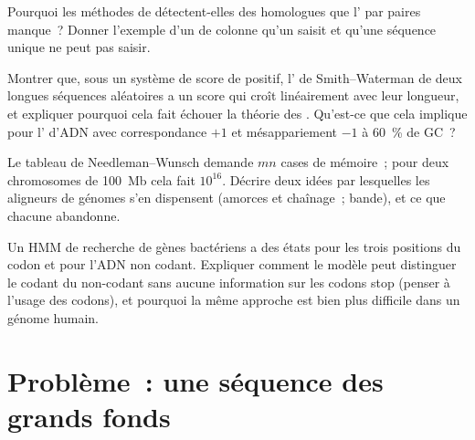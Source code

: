 \begin{exercise}[$\star\star$]\label{exo:b3:bioinformatics:9}
Pourquoi les méthodes de  détectent-elles des homologues que
l' par paires manque~? Donner l'exemple d'un  de colonne
qu'un  saisit et qu'une séquence unique ne peut pas saisir.
\end{exercise}

\begin{exercise}[$\star\star\star$]\label{exo:b3:bioinformatics:10}
Montrer que, sous un système de score de  positif,
l' de Smith--Waterman de deux longues séquences
aléatoires a un score qui croît linéairement avec leur longueur, et
expliquer pourquoi cela fait échouer la théorie des .
Qu'est-ce que cela implique pour l' d'ADN avec correspondance
$+1$ et mésappariement $-1$ à \qty{60}{\%} de GC~?
\end{exercise}

\begin{exercise}[$\star\star\star$]\label{exo:b3:bioinformatics:11}
Le tableau de Needleman--Wunsch demande $mn$ cases de mémoire~; pour
deux chromosomes de \qty{100}{Mb} cela fait $10^{16}$. Décrire deux
idées par lesquelles les aligneurs de génomes s'en dispensent (amorces
et chaînage~; bande), et ce que chacune abandonne.
\end{exercise}

\begin{exercise}[$\star\star\star$]\label{exo:b3:bioinformatics:12}
Un HMM de recherche de gènes bactériens a des états pour les trois
positions du codon et pour l'ADN non codant. Expliquer comment le
modèle peut distinguer le codant du non-codant sans aucune information
sur les codons stop (penser à l'usage des codons), et pourquoi la même
approche est bien plus difficile dans un génome humain.
\end{exercise}

\section{Problème~: une séquence des grands fonds}


